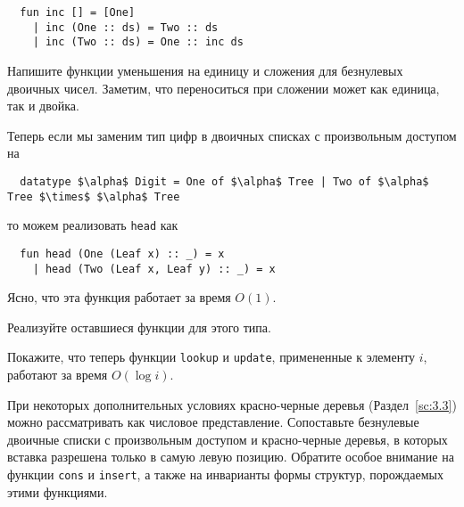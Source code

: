 \begin{frame}[fragile]{}
\begin{lstlisting}
  fun inc [] = [One]
    | inc (One :: ds) = Two :: ds
    | inc (Two :: ds) = One :: inc ds
\end{lstlisting}

\begin{exercise}\label{ex:9.4}
  Напишите функции уменьшения на единицу и сложения для безнулевых
  двоичных чисел. Заметим, что переноситься при сложении может как
  единица, так и двойка.
\end{exercise}

Теперь если мы заменим тип цифр в двоичных списках с произвольным
доступом на
\begin{lstlisting}
  datatype $\alpha$ Digit = One of $\alpha$ Tree | Two of $\alpha$ Tree $\times$ $\alpha$ Tree
\end{lstlisting}
то можем реализовать \lstinline!head! как
\begin{lstlisting}
  fun head (One (Leaf x) :: _) = x
    | head (Two (Leaf x, Leaf y) :: _) = x
\end{lstlisting}
Ясно, что эта функция работает за время $O(1)$.

\begin{exercise}\label{ex:9.5}
  Реализуйте оставшиеся функции для этого типа.
\end{exercise}

\end{frame}

\begin{frame}[fragile]{}

\begin{exercise}\label{ex:9.6}
  Покажите, что теперь функции \lstinline!lookup! и
  \lstinline!update!, примененные к элементу $i$, работают за время
  $O(\log i)$.
\end{exercise}

\begin{exercise}\label{ex:9.7}
  При некоторых дополнительных условиях красно-черные деревья
  (Раздел~\ref{sc:3.3}) можно рассматривать как числовое
  представление. Сопоставьте безнулевые двоичные списки с произвольным
  доступом и красно-черные деревья, в которых вставка разрешена только
  в самую левую позицию. Обратите особое внимание на функции
  \lstinline!cons! и \lstinline!insert!, а также на инварианты формы
  структур, порождаемых этими функциями.
\end{exercise}

\end{frame}

